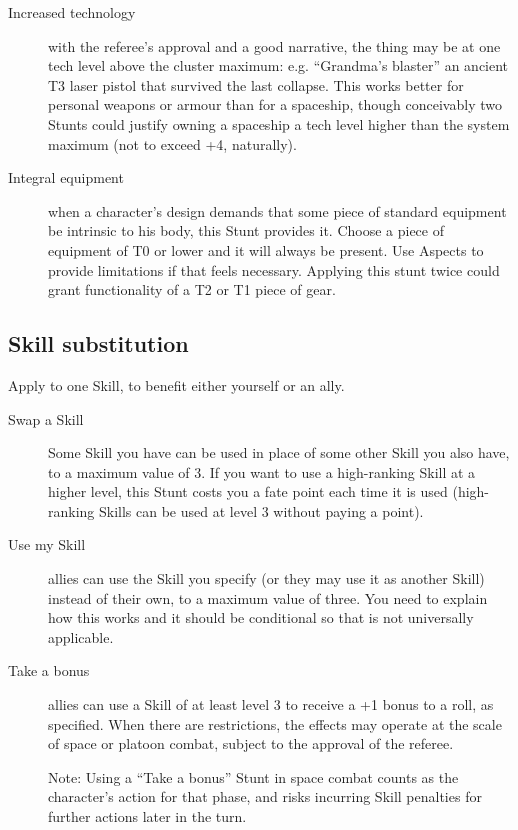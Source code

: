 \begin{description}
\item[Increased technology]
with the referee's approval and a good narrative, the thing may be at one tech level above the cluster maximum: e.g. ``Grand\-ma's blaster'' an ancient T3 laser pistol that survived the last collapse. This works better for personal weapons or armour than for a spaceship, though conceivably two Stunts could justify owning a spaceship a tech level higher than the system maximum (not to exceed +4, naturally).

\item[Integral equipment]
when a character's design demands that some piece of standard equipment be intrinsic to his body, this Stunt provides it. Choose a piece of equipment of T0 or lower and it will always be present. Use Aspects to provide limitations if that feels necessary. Applying this stunt twice could grant functionality of a T2 or T1 piece of gear.
\end{description}

\subsection{Skill substitution}

Apply to one Skill, to benefit either yourself or an ally.

\begin{description}
\item[Swap a Skill]
Some Skill you have can be used in place of some other Skill you also have, to a maximum value of 3. If you want to use a high-ranking Skill at a higher level, this Stunt costs you a fate point each time it is used (high-ranking Skills can be used at level 3 without paying a point).

\item[Use my Skill]
allies can use the Skill you specify (or they may use it as another Skill) instead of their own, to a maximum value of three. You need to explain how this works and it should be conditional so that is not universally applicable.

\item[Take a bonus]
allies can use a Skill of at least level 3 to receive a +1 bonus to a roll, as specified. When there are restrictions, the effects may operate at the scale of space or platoon combat, subject to the approval of the referee.

Note: Using a ``Take a bonus'' Stunt in space combat counts as the character's action for that phase, and risks incurring Skill penalties for further actions later in the turn.
\end{description}


